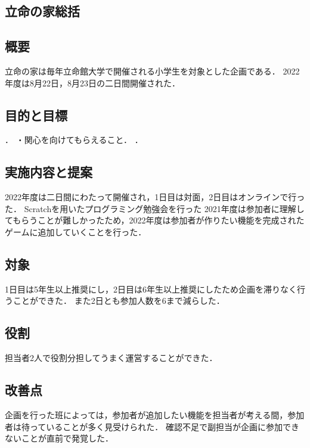 \subsection*{立命の家総括}


\subsection*{概要}
立命の家は毎年立命館大学で開催される小学生を対象とした企画である．
2022年度は8月22日，8月23日の二日間開催された．

\subsection*{目的と目標}
\begin{itemize}
    ．
    ・関心を向けてもらえること．
    ．
\end{itemize}
\subsection*{実施内容と提案}
2022年度は二日間にわたって開催され，1日目は対面，2日目はオンラインで行った．
Scratchを用いたプログラミング勉強会を行った
2021年度は参加者に理解してもらうことが難しかったため，2022年度は参加者が作りたい機能を完成されたゲームに追加していくことを行った．

\subsection*{対象}
1日目は5年生以上推奨にし，2日目は6年生以上推奨にしたため企画を滞りなく行うことができた．
また2日とも参加人数を6まで減らした．

\subsection*{役割}
担当者2人で役割分担してうまく運営することができた．

\subsection*{改善点}
企画を行った班によっては，参加者が追加したい機能を担当者が考える間，参加者は待っていることが多く見受けられた．
確認不足で副担当が企画に参加できないことが直前で発覚した．
